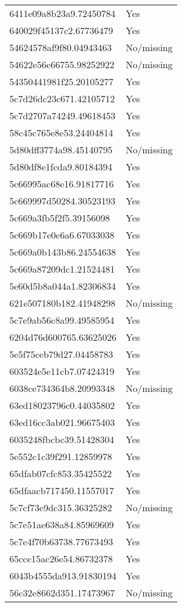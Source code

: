 \begin{tabular}{ll}
6411e09a8b23a9.72450784 & Yes \\
640029f45137c2.67736479 & Yes \\
54624578af9f80.04943463 & No/missing \\
54622e56e66755.98252922 & No/missing \\
54350441981f25.20105277 & Yes \\
5c7d26dc23c671.42105712 & Yes \\
5c7d2707a74249.49618453 & Yes \\
58c45c765e8e53.24404814 & Yes \\
5d80dff3774a98.45140795 & No/missing \\
5d80df8e1fcda9.80184394 & Yes \\
5c66995ac68e16.91817716 & Yes \\
5c669997d50284.30523193 & Yes \\
5c669a3fb5f2f5.39156098 & Yes \\
5c669b17e0e6a6.67033038 & Yes \\
5c669a0b143b86.24554638 & Yes \\
5c669a87209dc1.21524481 & Yes \\
5e60d5b8a044a1.82306834 & Yes \\
621e507180b182.41948298 & No/missing \\
5c7e9ab56c8a99.49585954 & Yes \\
6204d76d600765.63625026 & Yes \\
5e5f75ceb79d27.04458783 & Yes \\
603524e5e11cb7.07424319 & Yes \\
6038ce734364b8.20993348 & No/missing \\
63ed18023796c0.44035802 & Yes \\
63ed16cc3ab021.96675403 & Yes \\
6035248fbcbc39.51428304 & Yes \\
5e552c1c39f291.12859978 & Yes \\
65dfab07cfc853.35425522 & Yes \\
65dfaacb717450.11557017 & Yes \\
5c7cf73e9dc315.36325282 & No/missing \\
5c7e51ae638a84.85969609 & Yes \\
5c7e4f70b63738.77673493 & Yes \\
65cce15ac26e54.86732378 & Yes \\
6043b4555da913.91830194 & Yes \\
56c32e8662d351.17473967 & No/missing \\

\end{tabular}
